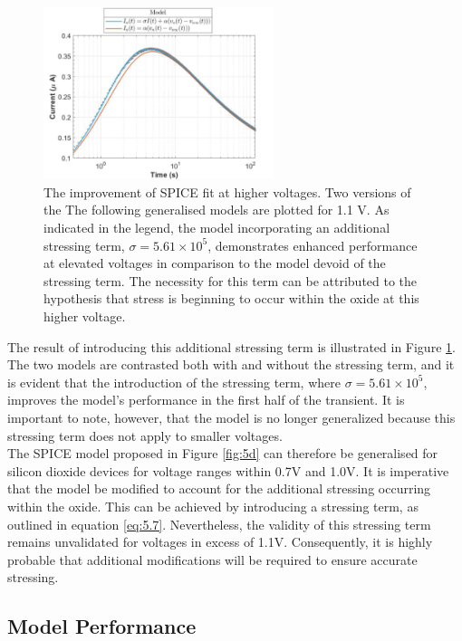 \begin{figure}[htbp!] 
    \centering    
    \includegraphics[width=0.6\textwidth]{Chapter5/Figs/g.png}
    \caption[The improvement of SPICE fit at higher voltages.]{The improvement of SPICE fit at higher voltages. Two versions of the The following generalised models are plotted for 1.1 V. As indicated in the legend, the model incorporating an additional stressing term, $\sigma = 5.61 \times 10^5$, demonstrates enhanced performance at elevated voltages in comparison to the model devoid of the stressing term. The necessity for this term can be attributed to the hypothesis that stress is beginning to occur within the oxide at this higher voltage.}
    \label{fig:5g}
\end{figure}

\noindent The result of introducing this additional stressing term is illustrated in Figure \ref{fig:5g}. The two models are contrasted both with and without the stressing term, and it is evident that the introduction of the stressing term, where $\sigma = 5.61 \times 10^5$, improves the model's performance in the first half of the transient. It is important to note, however, that the model is no longer generalized because this stressing term does not apply to smaller voltages.\\

\noindent The SPICE model proposed in Figure \ref{fig:5d} can therefore be generalised for silicon dioxide devices for voltage ranges within 0.7V and 1.0V. It is imperative that the model be modified to account for the additional stressing occurring within the oxide. This can be achieved by introducing a stressing term, as outlined in equation \ref{eq:5.7}. Nevertheless, the validity of this stressing term remains unvalidated for voltages in excess of 1.1V. Consequently, it is highly probable that additional modifications will be required to ensure accurate stressing.

\subsection[Model Performance]{Model Performance}

